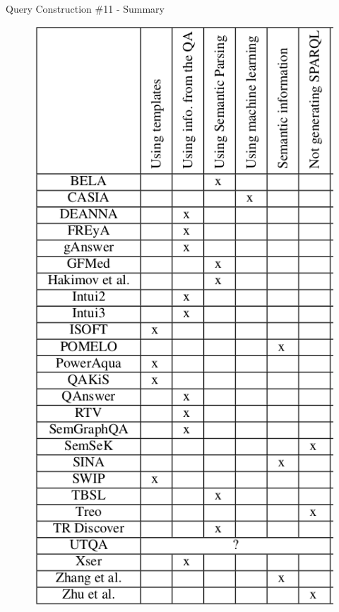 \documentclass{beamer}
\begin{document}
\begin{frame}{Query Construction \#11 - Summary}
  \begin{cardTiny}
    \begin{figure}\label{fig:qc_table}
      \centering
      \includegraphics[height=0.8\textheight]{./res/qc_table.png}
    \end{figure}
  \end{cardTiny}
\end{frame}

\note{}
\end{document}
